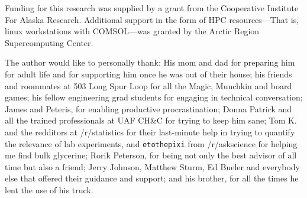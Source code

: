 Funding for this research was supplied by a grant from the Cooperative Institute
For Alaska Research. Additional support in the form of HPC resources---That is, 
linux workstations with COMSOL---was granted by the Arctic Region Supercomputing
Center.

The author would like to personally thank: His mom and dad for preparing him for
adult life and for supporting him once he was out of their house;
his friends and roommates at 503 Long Spur Loop for all the Magic, Munchkin and
board games;
his fellow engineering grad students for engaging in technical conversation;
James and Peteris, for enabling productive procrastination;
Donna Patrick and all the trained professionals at UAF CH\&C for trying to keep him sane;
Tom K. and the redditors at /r/statistics for their last-minute help in trying to quantify the relevance of lab experiments, and \texttt{etothepixi} from /r/askscience for
helping me find bulk glycerine;
Rorik Peterson, for being not only the best advisor of all time but also a friend;
Jerry Johnson, Matthew Sturm, Ed Bueler and everybody else that offered their guidance and support; 
and his brother, for all the times he lent the use of his truck.
